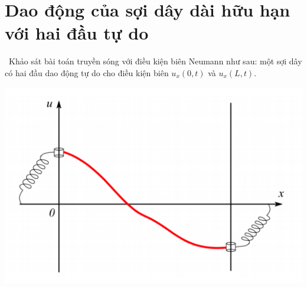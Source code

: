 \documentclass[10pt, a4paper]{article}
\begin{document}
	\section{Dao động của sợi dây dài hữu hạn với hai đầu tự do}
	\quad\,\,\,Khảo sát bài toán truyền sóng với điều kiện biên Neumann như sau: một sợi dây có hai đầu dao động tự do cho điều kiện biên $u_x(0,t)$ và $u_x(L,t)$. \begin{center}
		\includegraphics[width=0.4\linewidth]{x2FreeOscillation.png}
	\end{center}
\end{document}
